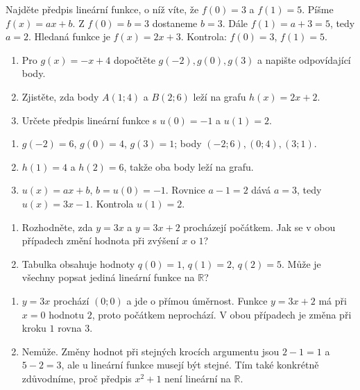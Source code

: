 \documentclass[11pt,a4paper]{article}
\begin{document}
\begin{prikladReseniBox}
Najděte předpis lineární funkce, o níž víte, že $f(0)=3$ a $f(1)=5$.
\tcblower
Píšme $f(x)=ax+b$. Z $f(0)=b=3$ dostaneme $b=3$. Dále $f(1)=a+3=5$, tedy $a=2$. Hledaná funkce je $f(x)=2x+3$. Kontrola: $f(0)=3$, $f(1)=5$.
\end{prikladReseniBox}
\begin{zadaniReseniBox}
\begin{enumerate}[label=\alph*)]
\item Pro $g(x)=-x+4$ dopočtěte $g(-2),g(0),g(3)$ a napište odpovídající body.
\item Zjistěte, zda body $A(1;4)$ a $B(2;6)$ leží na grafu $h(x)=2x+2$.
\item Určete předpis lineární funkce s $u(0)=-1$ a $u(1)=2$.
\end{enumerate}
\tcblower
\begin{enumerate}[label=\alph*)]
\item $g(-2)=6$, $g(0)=4$, $g(3)=1$; body $(-2;6),(0;4),(3;1)$.
\item $h(1)=4$ a $h(2)=6$, takže oba body leží na grafu.
\item $u(x)=ax+b$, $b=u(0)=-1$. Rovnice $a-1=2$ dává $a=3$, tedy $u(x)=3x-1$. Kontrola $u(1)=2$.
\end{enumerate}
\end{zadaniReseniBox}
\begin{zadaniReseniBox}[title={Diagnostika: přímá úměrnost a rovnoměrná změna}]
\begin{enumerate}[label=\alph*)]
\item Rozhodněte, zda $y=3x$ a $y=3x+2$ procházejí počátkem. Jak se v obou případech změní hodnota při zvýšení $x$ o $1$?
\item Tabulka obsahuje hodnoty $q(0)=1$, $q(1)=2$, $q(2)=5$. Může je všechny popsat jediná lineární funkce na $\mathbb R$?
\end{enumerate}
\tcblower
\begin{enumerate}[label=\alph*)]
\item $y=3x$ prochází $(0;0)$ a jde o přímou úměrnost. Funkce $y=3x+2$ má při $x=0$ hodnotu $2$, proto počátkem neprochází. V obou případech je změna při kroku $1$ rovna $3$.
\item Nemůže. Změny hodnot při stejných krocích argumentu jsou $2-1=1$ a $5-2=3$, ale u lineární funkce musejí být stejné. Tím také konkrétně zdůvodníme, proč předpis $x^2+1$ není lineární na $\mathbb R$.
\end{enumerate}
\end{zadaniReseniBox}
\end{document}
